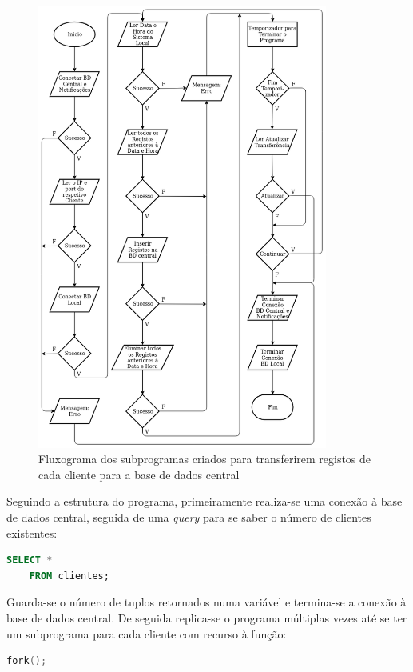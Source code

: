 \documentclass[11pt,twoside,a4paper]{report}
\begin{document}
\begin{figure}
	\begin{center}
		\includegraphics[width=0.85\textwidth]{fluxograma_transferencia_subprograma3} %
		\caption{Fluxograma dos subprogramas criados para transferirem registos de cada cliente para a base de dados central}
		\label{fig:transferencia_subprograma}
	\end{center}
\end{figure}
Seguindo a estrutura do programa, primeiramente realiza-se uma conexão à base de dados central, seguida de uma \textit{query} para se saber o número de clientes existentes:
\begin{lstlisting}[language = SQL]
	SELECT *
	FROM clientes;
\end{lstlisting}
Guarda-se o número de tuplos retornados numa variável e termina-se a conexão à base de dados central. De seguida replica-se o programa múltiplas vezes até se ter um subprograma para cada cliente com recurso à função:
\begin{lstlisting}[language = C]
	fork();
\end{lstlisting}
\end{document}
